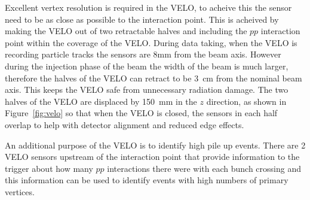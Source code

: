 Excellent vertex resolution is required in the VELO, to acheive this the sensor need to be as close as possible to the interaction point. This is acheived by making the VELO out of two retractable halves and including the $pp$ interaction point within the coverage of the VELO. 
During data taking, when the VELO is recording particle tracks the sensors are 8mm from the beam axis. However during the injection phase of the beam the width of the beam is much larger, therefore the halves of the VELO can retract to be 3~cm from the nominal beam axis. This keeps the VELO safe from unnecessary radiation damage. The two halves of the VELO are displaced by 150~mm in the $z$ direction, as shown in Figure~\ref{fig:velo} so that when the VELO is closed, the sensors in each half overlap to help with detector alignment and reduced edge effects. 



An additional purpose of the VELO is to identify high pile up events. There are 2 VELO sensors upstream of the interaction point that provide information to the trigger about how many $pp$ interactions there were with each bunch crossing and this information can be used to identify events with high numbers of primary vertices. %

